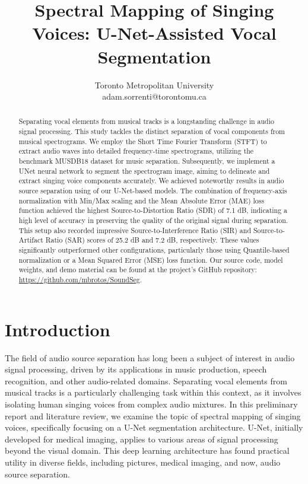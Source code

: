 \documentclass[conference]{IEEEtran}
\begin{document}
\title{Spectral Mapping of Singing Voices: U-Net-Assisted Vocal Segmentation}

\author{
    Toronto Metropolitan University\\
    adam.sorrenti@torontomu.ca
}

\maketitle

\begin{abstract}
Separating vocal elements from musical tracks is a longstanding challenge in audio signal processing. This study tackles the distinct separation of vocal components from musical spectrograms. We employ the Short Time Fourier Transform (STFT) to extract audio waves into detailed frequency-time spectrograms, utilizing the benchmark MUSDB18 dataset for music separation. Subsequently, we implement a UNet neural network to segment the spectrogram image, aiming to delineate and extract singing voice components accurately. We achieved noteworthy results in audio source separation using of our U-Net-based models. The combination of frequency-axis normalization with Min/Max scaling and the Mean Absolute Error (MAE) loss function achieved the highest Source-to-Distortion Ratio (SDR) of 7.1 dB, indicating a high level of accuracy in preserving the quality of the original signal during separation. This setup also recorded impressive Source-to-Interference Ratio (SIR) and Source-to-Artifact Ratio (SAR) scores of 25.2 dB and 7.2 dB, respectively. These values significantly outperformed other configurations, particularly those using Quantile-based normalization or a Mean Squared Error (MSE) loss function. Our source code, model weights, and demo material can be found at the project's GitHub repository: \url{https://github.com/mbrotos/SoundSeg}.
\end{abstract}

\IEEEpeerreviewmaketitle



\section{Introduction}

The field of audio source separation has long been a subject of interest in audio signal processing, driven by its applications in music production, speech recognition, and other audio-related domains. Separating vocal elements from musical tracks is a particularly challenging task within this context, as it involves isolating human singing voices from complex audio mixtures. In this preliminary report and literature review, we examine the topic of spectral mapping of singing voices, specifically focusing on a U-Net \cite{ronneberger2015unet} segmentation architecture. U-Net, initially developed for medical imaging, applies to various areas of signal processing beyond the visual domain. This deep learning architecture has found practical utility in diverse fields, including pictures, medical imaging, and now, audio source separation.
\end{document}
